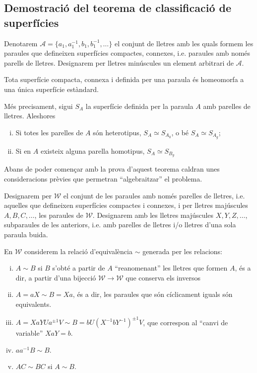 \documentclass[../main.tex]{subfiles}
\begin{document}
\subsection{Demostració del teorema de classificació de superfícies}

Denotarem $\mathcal{A} = \{a_1,a_1^{- 1},b_1,b_1^{-1},\ldots\}$ el conjunt de lletres amb les quals formem les paraules que defineixen superfícies compactes, connexes, i.e. paraules amb només parells de lletres. Designarem per lletres minúscules un element arbitrari de $\mathcal{A}$.

\begin{ter}
\label{ter:riemannsuperficiesparaules} Tota superfície compacta, connexa i definida per una paraula és homeomorfa a una única superfície estàndard.

Més precisament, sigui $S_A$ la superfície definida per la paraula $A$ amb parelles de lletres. Aleshores
\begin{enumerate}[(i)]
    \item Si totes les parelles de $A$ són heterotipus, $S_A\simeq S_{A_0}$, o bé $S_A\simeq S_{A_g}$;
    \item Si en $A$ existeix alguna parella homotipus, $S_A\simeq S_{B_g}$
\end{enumerate}
\end{ter}
Abans de poder començar amb la prova d'aquest teorema caldran unes consideracions prèvies que permetran ``algebraitzar'' el problema.

Designarem per $\mathcal{W}$ el conjunt de les paraules amb només parelles de lletres, i.e. aquelles que defineixen superfícies compactes i connexes, i per lletres majúscules $A,B,C,\ldots$, les paraules de $\mathcal{W}$. Designarem amb les lletres majúscules $X,Y,Z,\ldots$, subparaules de les anteriors, i.e. amb parelles de lletres i/o lletres d'una sola paraula buida.

En $\mathcal{W}$ considerem la relació d'equivalència $\sim$ generada per les relacions:
\begin{enumerate}[(i)]
    \item $A\sim B$ si $B$ s'obté a partir de $A$ ``reanomenant'' les lletres que formen $A$, és a dir, a partir d'una bijecció $\mathcal{W}\rightarrow \mathcal{W}$ que conserva els inversos
    \item $A=aX\sim B=Xa$, és a dir, les paraules que són cíclicament iguals són equivalents.
    \item $A = XaYUa^{\pm 1}V\sim B=bU(X^{-1}bY^{-1})^{\pm 1}V$, que correspon al ``canvi de variable'' $XaY=b$.
    \item $aa^{-1}B\sim B$.
    \item $AC\sim BC$ si $A\sim B$.
\end{enumerate}
\end{document}

